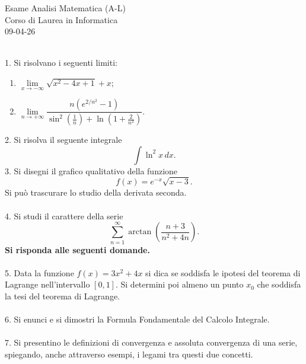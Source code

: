 \documentclass[12pt,a4paper]{article}
\date{}
\theoremstyle{definition}
\numberwithin{equation}{section} \numberwithin{figure}{section}
\numberwithin{table}{section}
\begin{document}
\begin{center}
Esame Analisi Matematica (A-L)\\
Corso di Laurea in Informatica\\
09-04-26
\end{center}

\ \\
1.  \indent Si risolvano i seguenti limiti:
\begin{enumerate}
\item[(a)] $\lim\limits_{x \to -\infty} \sqrt{x^2-4x+1}+x;$
\item[(b)] $\lim\limits_{n \to +\infty} \dfrac{n (e^{2/n^2}-1)}{\sin^2\left(\frac{1}{n}\right) + \ln\left(1+\frac{2}{n^2}\right)}.$
\end{enumerate}
2. \indent Si risolva il seguente integrale
$$\int \ln^2 x \, dx.$$
3. \indent Si disegni il grafico qualitativo della funzione
 \begin{equation*}
 f(x)=e^{-x} \sqrt{x-3}.
\end{equation*}
Si può trascurare lo studio della derivata seconda.\\ \\
4. \indent Si studi il carattere della serie
$$\sum_{n=1}^\infty \arctan \left(\dfrac{n+3}{n^2+4n}\right).$$
\textbf{Si risponda alle seguenti domande.} \\ \\
5. \indent  Data la funzione $f(x)=3x^2+4x$ si dica se soddisfa le ipotesi del teorema di Lagrange nell'intervallo $[0, 1]$. Si determini poi almeno un punto $x_0$ che soddisfa la tesi del teorema di Lagrange. \\ \\
6. \indent Si enunci e si dimostri la Formula Fondamentale del Calcolo Integrale. \\ \\
7. \indent Si presentino le definizioni di convergenza e assoluta convergenza di una serie, spiegando, anche attraverso esempi, i legami tra questi due concetti.\\ \\
\end{document}
